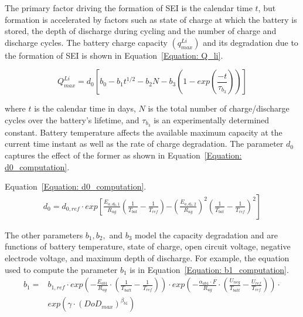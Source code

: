 The primary factor driving the formation of SEI is the calendar time $t$, but formation is accelerated by factors such as state of charge at which the battery is stored, the depth of discharge during cycling and the number of charge and discharge cycles. The battery charge capacity $(q_{max}^{Li})$ and its degradation due to the formation of SEI is shown in Equation~\ref{Equation: Q_li}. 

\begin{equation}
Q_{max}^{Li} = d_0 \left[b_0 - b_1t^{1/2} - b_2N - b_3\left(1-exp (\frac{-t}{\tau_{b_3}})\right)\right]
\label{Equation: Q_li}
\end{equation}

where $t$ is the calendar time in days, $N$ is the total number of charge/discharge cycles over the battery's lifetime, and $\tau_{b_3}$ is an experimentally determined constant. Battery temperature affects the available maximum capacity at the current time instant as well as the rate of charge degradation. The parameter $d_0$ captures the effect of the former as shown in Equation~\ref{Equation: d0_computation}. 

Equation~\ref{Equation: d0_computation}. 
\begin{equation}
\begin{split}
d_0 = d_{0,ref} \cdot exp\left[\frac{E_{a,d_0,1}}{R_{ug}}\left(\frac{1}{T_{bat}} - \frac{1}{T_{ref}}\right) \right. \left. - \left(\frac{E_{a,d_0,2}}{R_{ug}}\right)^2 \left(\frac{1}{T_{bat}} - \frac{1}{T_{ref}}\right)^2 \right]
\end{split}
\label{Equation: d0_computation}
\end{equation}

The other parameters $b_1,b_2,$ and $b_3$  model the capacity degradation and are functions of battery temperature, state of charge, open circuit voltage, negative electrode voltage, and maximum depth of discharge. For example, the equation used to compute the parameter $b_1$ is in Equation~\ref{Equation: b1_computation}.
\begin{equation}
\begin{split}
    b_1 = & b_{1,ref} \cdot exp\left(-\frac{E_{ab1}}{R_{ug}} \cdot \left(\frac{1}{T_{batt}} - \frac{1}{T_{ref}}\right) \right) \cdot
exp\left(-\frac{\alpha_{ab1}\cdot F}{R_{ug}} \cdot \left(\frac{U_{neg}}{T_{batt}} - \frac{U_{ref}}{T_{ref}}\right) \right) \cdot  \\
& exp\left(\gamma \cdot (DoD_{max})^{\beta_{b1}}\right) \\
\end{split}
\label{Equation: b1_computation}
\end{equation}

